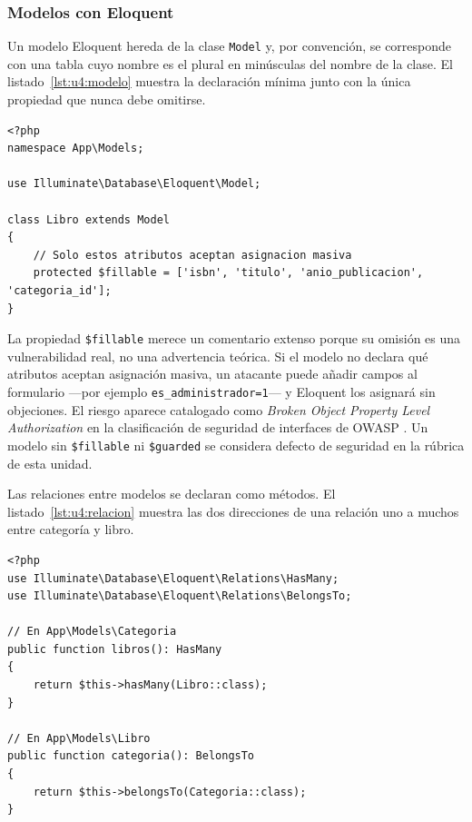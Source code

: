 \documentclass[11pt,a4paper,openany]{book}
\begin{document}
\subsubsection{Modelos con Eloquent}

Un modelo Eloquent hereda de la clase \texttt{Model} y, por convención, se corresponde con una tabla cuyo nombre es el plural en minúsculas del nombre de la clase. El listado~\ref{lst:u4:modelo} muestra la declaración mínima junto con la única propiedad que nunca debe omitirse.

\begin{lstlisting}[style=php,caption={Modelo Eloquent minimo con proteccion contra asignacion masiva.},label={lst:u4:modelo}]
<?php
namespace App\Models;

use Illuminate\Database\Eloquent\Model;

class Libro extends Model
{
	// Solo estos atributos aceptan asignacion masiva
	protected $fillable = ['isbn', 'titulo', 'anio_publicacion', 'categoria_id'];
}
\end{lstlisting}

La propiedad \texttt{\$fillable} merece un comentario extenso porque su omisión es una vulnerabilidad real, no una advertencia teórica. Si el modelo no declara qué atributos aceptan asignación masiva, un atacante puede añadir campos al formulario ---por ejemplo \texttt{es\_administrador=1}--- y Eloquent los asignará sin objeciones. El riesgo aparece catalogado como \emph{Broken Object Property Level Authorization} en la clasificación de seguridad de interfaces de OWASP \cite{owasp2023api}. Un modelo sin \texttt{\$fillable} ni \texttt{\$guarded} se considera defecto de seguridad en la rúbrica de esta unidad.

Las relaciones entre modelos se declaran como métodos. El listado~\ref{lst:u4:relacion} muestra las dos direcciones de una relación uno a muchos entre categoría y libro.

\begin{lstlisting}[style=php,caption={Relaciones uno a muchos en ambas direcciones.},label={lst:u4:relacion}]
<?php
use Illuminate\Database\Eloquent\Relations\HasMany;
use Illuminate\Database\Eloquent\Relations\BelongsTo;

// En App\Models\Categoria
public function libros(): HasMany
{
	return $this->hasMany(Libro::class);
}

// En App\Models\Libro
public function categoria(): BelongsTo
{
	return $this->belongsTo(Categoria::class);
}
\end{lstlisting}
\end{document}
